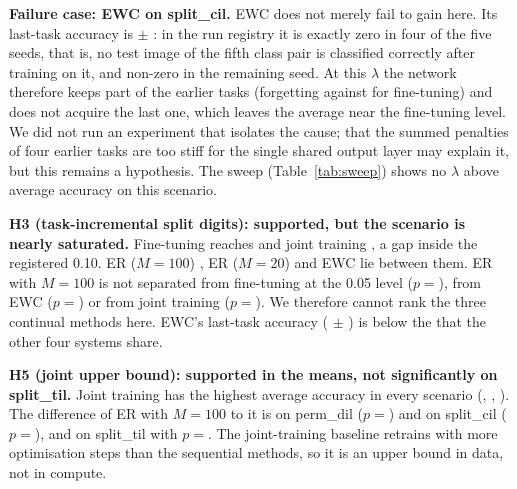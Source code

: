 \textbf{Failure case: EWC on split\_cil.} EWC does not merely fail to gain here. Its last-task accuracy is  $\pm$ : in the run registry it is exactly zero in four of the five seeds, that is, no test image of the fifth class pair is classified correctly after training on it, and non-zero in the remaining seed. At this $\lambda$ the network therefore keeps part of the earlier tasks (forgetting  against  for fine-tuning) and does not acquire the last one, which leaves the average near the fine-tuning level. We did not run an experiment that isolates the cause; that the summed penalties of four earlier tasks are too stiff for the single shared output layer may explain it, but this remains a hypothesis. The sweep (Table~\ref{tab:sweep}) shows no $\lambda$ above  average accuracy on this scenario.

\textbf{H3 (task-incremental split digits): supported, but the scenario is nearly saturated.} Fine-tuning reaches  and joint training , a gap inside the registered 0.10. ER ($M{=}100$) , ER ($M{=}20$)  and EWC  lie between them. ER with $M{=}100$ is not separated from fine-tuning at the 0.05 level ($p{=}$), from EWC ($p{=}$) or from joint training ($p{=}$). We therefore cannot rank the three continual methods here. EWC's last-task accuracy ( $\pm$ ) is below the  that the other four systems share.

\textbf{H5 (joint upper bound): supported in the means, not significantly on split\_til.} Joint training has the highest average accuracy in every scenario (, , ). The difference of ER with $M{=}100$ to it is  on perm\_dil ($p{=}$) and  on split\_cil ($p{=}$), and  on split\_til with $p{=}$. The joint-training baseline retrains with more optimisation steps than the sequential methods, so it is an upper bound in data, not in compute.

